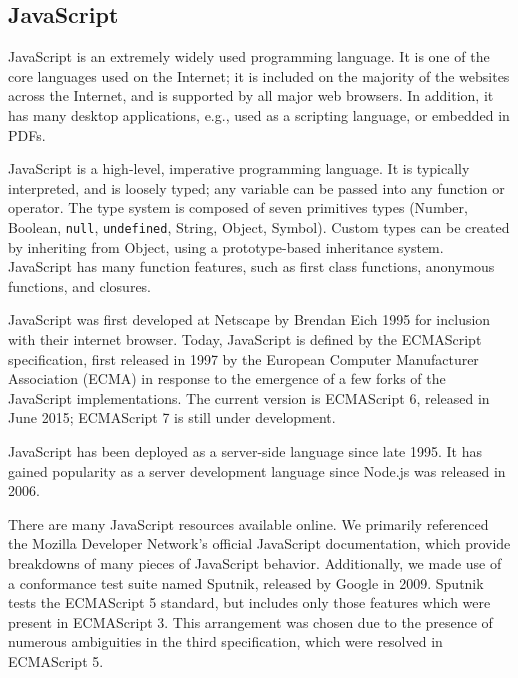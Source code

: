 \documentclass{article}
\begin{document}
\begin{multicols}{2}
\subsection{JavaScript}

JavaScript is an extremely widely used programming language. It is one of the
core languages used on the Internet; it is included on the majority of the
websites across the Internet, and is supported by all major web browsers. In
addition, it has many desktop applications, e.g., used as a scripting
language, or embedded in PDFs. \newline

JavaScript is a high-level, imperative programming language. It is typically
interpreted, and is loosely typed; any variable can be passed into any function
or operator. The type system is composed of seven primitives types (Number,
Boolean, \texttt{null}, \texttt{undefined}, String, Object, Symbol). Custom
types can be created by inheriting from Object, using a prototype-based
inheritance system. JavaScript has many function features, such as first class
functions, anonymous functions, and closures. \newline

JavaScript was first developed at Netscape by Brendan Eich 1995 for inclusion
with their internet browser. Today, JavaScript is defined by the ECMAScript
specification, first released in 1997 by the European Computer Manufacturer
Association (ECMA) in response to the emergence of a few forks of the JavaScript
implementations. The current version is ECMAScript 6, released in June 2015;
ECMAScript 7 is still under development.\newline

JavaScript has been deployed as a server-side language since late 1995. It has
gained popularity as a server development language since Node.js was released in
2006.\newline

There are many JavaScript resources available online. We primarily referenced
the Mozilla Developer Network's official JavaScript documentation\cite{mozdocs},
which provide breakdowns of many pieces of JavaScript behavior. Additionally, we
made use of a conformance test suite named Sputnik, released by Google in 2009.
Sputnik tests the ECMAScript 5 standard, but includes only those features
which were present in ECMAScript 3. This arrangement was chosen due to the
presence of numerous ambiguities in the third specification, which were resolved
in ECMAScript 5.


\end{multicols}
\end{document}

